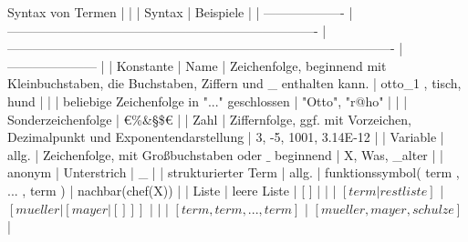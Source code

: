 \documentclass[a4paper]{article}
\begin{document}
\begin{multicols}{3}
  Syntax von Termen
  |                     |                                                                           | Syntax                                                                                      | Beispiele             |
  | ------------------- | ------------------------------------------------------------------------- | ------------------------------------------------------------------------------------------- | --------------------- |
  | Konstante           | Name                                                                      | Zeichenfolge, beginnend mit Kleinbuchstaben, die Buchstaben, Ziffern und \_ enthalten kann. | otto\_1 , tisch, hund |
  |                     | beliebige Zeichenfolge in "..." geschlossen                               | "Otto", "r@ho"                                                                              |
  |                     | Sonderzeichenfolge                                                        | €\%\&§\$€                                                                                      |
  | Zahl                | Ziffernfolge, ggf. mit Vorzeichen, Dezimalpunkt und Exponentendarstellung | 3, -5, 1001, 3.14E-12                                                                       |
  | Variable            | allg.                                                                     | Zeichenfolge, mit Großbuchstaben oder $\_$ beginnend                                          | X, Was, \_alter        |
  | anonym              | Unterstrich                                                               | \_                                                                                          |
  | strukturierter Term | allg.                                                                     | funktionssymbol( term , ... , term )                                                        | nachbar(chef(X))      |
  | Liste               | leere Liste                                                               | [ ]                                                                                         |
  |                     | $[term | restliste]$                                                                                 | $[mueller | [mayer | []]]$ |
  |                     | $[term , term , ... , term ]$                                             | $[ mueller, mayer, schulze ]$                                                               |


\end{multicols}
\end{document}
